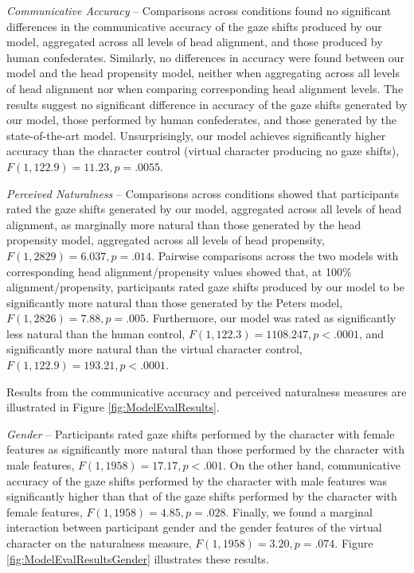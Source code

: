 \emph{Communicative Accuracy} -- Comparisons across conditions found no significant differences in the communicative accuracy of the gaze shifts produced by our model, aggregated across all levels of head alignment, and those produced by human confederates. Similarly, no differences in accuracy were found between our model and the head propensity model, neither when aggregating across all levels of head alignment nor when comparing corresponding head alignment levels. The results suggest no significant difference in accuracy of the gaze shifts generated by our model, those performed by human confederates, and those generated by the state-of-the-art model. Unsurprisingly, our model achieves significantly higher accuracy than the character control (virtual character producing no gaze shifts), $F(1, 122.9) = 11.23, p = .0055$.

\emph{Perceived Naturalness} -- Comparisons across conditions showed that participants rated the gaze shifts generated by our model, aggregated across all levels of head alignment, as marginally more natural than those generated by the head propensity model, aggregated across all levels of head propensity, $F(1, 2829) = 6.037, p = .014$. Pairwise comparisons across the two models with corresponding head alignment/propensity values showed that, at 100\% alignment/propensity, participants rated gaze shifts produced by our model to be significantly more natural than those generated by the Peters model, $F(1, 2826) = 7.88, p = .005$. Furthermore, our model was rated as significantly less natural than the human control, $F(1, 122.3) = 1108.247, p < .0001$, and significantly more natural than the virtual character control, $F(1, 122.9) = 193.21, p < .0001$.

Results from the communicative accuracy and perceived naturalness measures are illustrated in Figure \ref{fig:ModelEvalResults}.

\emph{Gender} -- Participants rated gaze shifts performed by the character with female features as significantly more natural than those performed by the character with male features, $F(1, 1958) = 17.17, p < .001$. On the other hand, communicative accuracy of the gaze shifts performed by the character with male features was significantly higher than that of the gaze shifts performed by the character with female features, $F(1, 1958) = 4.85, p = .028$. Finally, we found a marginal interaction between participant gender and the gender features of the virtual character on the naturalness measure, $F(1, 1958) = 3.20, p = .074$. Figure \ref{fig:ModelEvalResultsGender} illustrates these results.

